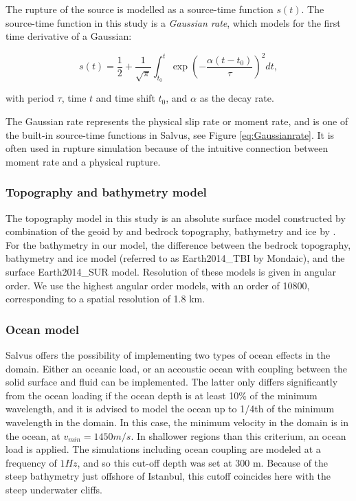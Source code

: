 \documentclass[../Text/00main.tex]{subfiles}
\begin{document}
The rupture of the source is modelled as a source-time function $s(t)$. The source-time function in this study is a \textit{Gaussian rate}, which models for the first time derivative of a Gaussian: 

\begin{equation}
s(t)=\frac{1}{2}+\frac{1}{\sqrt{\pi}} \int_{t_{0}}^{t} \exp \left(-\frac{\alpha\left(t-t_{0}\right)}{\tau}\right)^{2} dt , 
\label{eq:Gaussianrate}
\end{equation}

with period $\tau$, time $t$ and time shift $t_0$, and $\alpha$ as the decay rate.  

The Gaussian rate represents the physical slip rate or moment rate, and is one of the built-in source-time functions in Salvus, see Figure \ref{eq:Gaussianrate}. It is often used in rupture simulation because of the intuitive connection between moment rate and a physical rupture. 

\subsubsection{Topography and bathymetry model}

The topography model in this study is an absolute surface model constructed by combination of the geoid by \citet{pavlis2012development} and bedrock topography, bathymetry and ice by \citet{hirt2015earth2014}. For the bathymetry in our model, the difference between the bedrock topography, bathymetry and ice model (referred to as Earth2014\_TBI by Mondaic), and the surface Earth2014\_SUR model. Resolution of these models is given in angular order. We use the highest angular order models, with an order of 10800, corresponding to a spatial resolution of 1.8 km. 

\subsubsection{Ocean model}

Salvus offers the possibility of implementing two types of ocean effects in the domain. Either an oceanic load, or an accoustic ocean with coupling between the solid surface and fluid can be implemented. The latter only differs significantly from the ocean loading if the ocean depth is at least 10\% of the minimum wavelength, and it is advised to model the ocean up to 1/4th of the minimum wavelength in the domain. In this case, the minimum velocity in the domain is in the ocean, at $v_{min} = 1450 m/s$. In shallower regions than this criterium, an ocean load is applied. The simulations including ocean coupling are modeled at a frequency of $1 Hz$, and so this cut-off  depth was set at 300 m. Because of the steep bathymetry just offshore of Istanbul, this cutoff coincides here with the steep underwater cliffs. 
\end{document}
